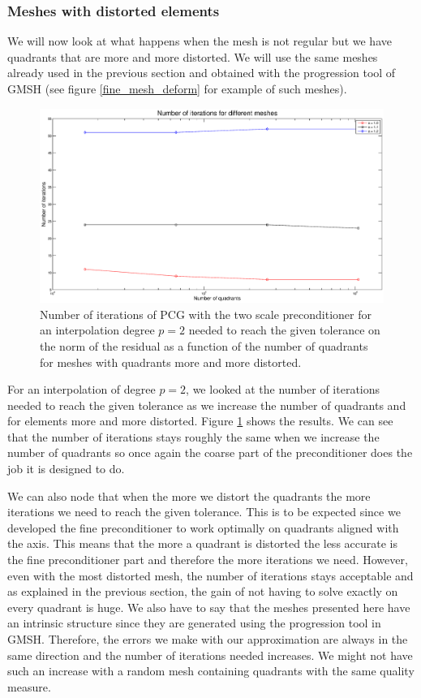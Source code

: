 \subsubsection{Meshes with distorted elements}

We will now look at what happens when the mesh is not regular but we have quadrants that are more and more distorted. We will use the same meshes already used in the previous section and obtained with the progression tool of GMSH (see figure \ref{fine_mesh_deform} for example of such meshes).

\begin{figure}
\centering
\includegraphics[scale=0.35]{Results/two_irreg_iter.eps}
\caption{Number of iterations of PCG with the two scale preconditioner for an interpolation degree $p=2$ needed to reach the given tolerance on the norm of the residual as a function of the number of quadrants for meshes with quadrants more and more distorted.}
\label{two_irreg_iter}
\end{figure}

For an interpolation of degree $p=2$, we looked at the number of iterations needed to reach the given tolerance as we increase the number of quadrants and for elements more and more distorted. Figure \ref{two_irreg_iter} shows the results. We can see that the number of iterations stays roughly the same when we increase the number of quadrants so once again the coarse part of the preconditioner does the job it is designed to do. 

We can also node that when the more we distort the quadrants the more iterations we need to reach the given tolerance. This is to be expected since we developed the fine preconditioner to work optimally on quadrants aligned with the axis. This means that the more a quadrant is distorted the less accurate is the fine preconditioner part and therefore the more iterations we need. However, even with the most distorted mesh, the number of iterations stays acceptable and as explained in the previous section, the gain of not having to solve exactly on every quadrant is huge. We also have to say that the meshes presented here have an intrinsic structure since they are generated using the progression tool in GMSH. Therefore, the errors we make with our approximation are always in the same direction and the number of iterations needed increases. We might not have such an increase with a random mesh containing quadrants with the same quality measure. 


